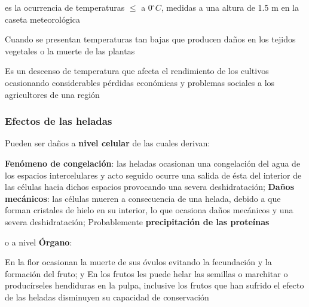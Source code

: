         
        \begin{definition}[Meteorológica]
            es la ocurrencia de temperaturas $\leq$ a 0$^{\circ}C$, medidas a una altura de 1.5 m en la caseta meteorológica
        \end{definition}
        \begin{definition}[Agrícola]
            Cuando se presentan temperaturas tan bajas que producen daños en los tejidos vegetales o la muerte de las plantas
        \end{definition}
        \begin{definition}[Socioeconomica]
            Es un descenso de temperatura que afecta el rendimiento de los cultivos ocasionando considerables pérdidas económicas y problemas sociales a los agricultores de una región
        \end{definition}
        
        \subsubsection{Efectos de las heladas}
        
        Pueden ser daños a \textbf{nivel celular} de las cuales derivan:
        
        \textbf{Fenómeno de congelación}: las heladas ocasionan una congelación del agua de los espacios intercelulares y acto seguido ocurre una salida de ésta del interior de las células hacia dichos espacios provocando una severa deshidratación; \textbf{Daños mecánicos}: las células mueren a consecuencia de una helada, debido a que forman cristales de hielo en su interior, lo que ocasiona daños mecánicos y una severa deshidratación; Probablemente \textbf{precipitación de las proteínas}
        
        o a nivel \textbf{Órgano}:
        
        En la flor ocasionan la muerte de sus óvulos evitando la fecundación y la formación del fruto; y En los frutos les puede helar las semillas o marchitar o producírseles hendiduras en la pulpa, inclusive los frutos que han sufrido el efecto de las heladas disminuyen su capacidad de conservación
        
